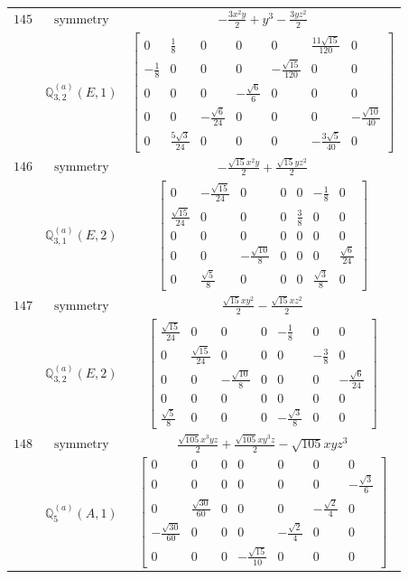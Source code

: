 \documentclass[fleqn,8pt,landscape]{jsarticle}
\begin{document}
\begin{longtable}{ccc}
$ 145 $ & $ \text{symmetry} $ & $ - \frac{3 x^{2} y}{2} + y^{3} - \frac{3 y z^{2}}{2} $ \\
$  $ & $ \mathbb{Q}_{3,2}^{(a)}(E,1) $ & $ \begin{bmatrix} 0 & \frac{1}{8} & 0 & 0 & 0 & \frac{11 \sqrt{15}}{120} & 0 \\ - \frac{1}{8} & 0 & 0 & 0 & - \frac{\sqrt{15}}{120} & 0 & 0 \\ 0 & 0 & 0 & - \frac{\sqrt{6}}{6} & 0 & 0 & 0 \\ 0 & 0 & - \frac{\sqrt{6}}{24} & 0 & 0 & 0 & - \frac{\sqrt{10}}{40} \\ 0 & \frac{5 \sqrt{3}}{24} & 0 & 0 & 0 & - \frac{3 \sqrt{5}}{40} & 0 \end{bmatrix} $ \\ \hline
$ 146 $ & $ \text{symmetry} $ & $ - \frac{\sqrt{15} x^{2} y}{2} + \frac{\sqrt{15} y z^{2}}{2} $ \\
$  $ & $ \mathbb{Q}_{3,1}^{(a)}(E,2) $ & $ \begin{bmatrix} 0 & - \frac{\sqrt{15}}{24} & 0 & 0 & 0 & - \frac{1}{8} & 0 \\ \frac{\sqrt{15}}{24} & 0 & 0 & 0 & \frac{3}{8} & 0 & 0 \\ 0 & 0 & 0 & 0 & 0 & 0 & 0 \\ 0 & 0 & - \frac{\sqrt{10}}{8} & 0 & 0 & 0 & \frac{\sqrt{6}}{24} \\ 0 & \frac{\sqrt{5}}{8} & 0 & 0 & 0 & \frac{\sqrt{3}}{8} & 0 \end{bmatrix} $ \\ \hline
$ 147 $ & $ \text{symmetry} $ & $ \frac{\sqrt{15} x y^{2}}{2} - \frac{\sqrt{15} x z^{2}}{2} $ \\
$  $ & $ \mathbb{Q}_{3,2}^{(a)}(E,2) $ & $ \begin{bmatrix} \frac{\sqrt{15}}{24} & 0 & 0 & 0 & - \frac{1}{8} & 0 & 0 \\ 0 & \frac{\sqrt{15}}{24} & 0 & 0 & 0 & - \frac{3}{8} & 0 \\ 0 & 0 & - \frac{\sqrt{10}}{8} & 0 & 0 & 0 & - \frac{\sqrt{6}}{24} \\ 0 & 0 & 0 & 0 & 0 & 0 & 0 \\ \frac{\sqrt{5}}{8} & 0 & 0 & 0 & - \frac{\sqrt{3}}{8} & 0 & 0 \end{bmatrix} $ \\ \hline
$ 148 $ & $ \text{symmetry} $ & $ \frac{\sqrt{105} x^{3} y z}{2} + \frac{\sqrt{105} x y^{3} z}{2} - \sqrt{105} x y z^{3} $ \\
$  $ & $ \mathbb{Q}_{5}^{(a)}(A,1) $ & $ \begin{bmatrix} 0 & 0 & 0 & 0 & 0 & 0 & 0 \\ 0 & 0 & 0 & 0 & 0 & 0 & - \frac{\sqrt{3}}{6} \\ 0 & \frac{\sqrt{30}}{60} & 0 & 0 & 0 & - \frac{\sqrt{2}}{4} & 0 \\ - \frac{\sqrt{30}}{60} & 0 & 0 & 0 & - \frac{\sqrt{2}}{4} & 0 & 0 \\ 0 & 0 & 0 & - \frac{\sqrt{15}}{10} & 0 & 0 & 0 \end{bmatrix} $ \\ \hline

\end{longtable}
\end{document}

